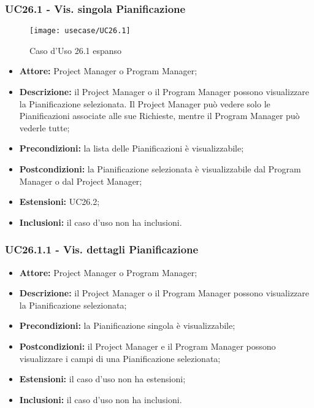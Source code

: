\subsubsection*{UC26.1 - Vis. singola Pianificazione}
\begin{figure}[H] 
    \texttt{[image: usecase/UC26.1]} 
    \caption{Caso d'Uso 26.1 espanso}
\end{figure}

\begin{itemize}[label=$\circ$]
\item \textbf{Attore:}  Project Manager o Program Manager;
\item \textbf{Descrizione:} il Project Manager o il Program Manager possono visualizzare la Pianificazione selezionata. Il Project Manager può vedere solo le Pianificazioni associate alle sue Richieste, mentre il Program Manager può vederle tutte;
\item \textbf{Precondizioni:} la lista delle Pianificazioni è visualizzabile;
\item \textbf{Postcondizioni:} la Pianificazione selezionata è visualizzabile dal Program Manager o dal Project Manager;
\item \textbf{Estensioni:} UC26.2;
\item \textbf{Inclusioni:} il caso d'uso non ha inclusioni.
\end{itemize}

\subsubsection*{UC26.1.1 - Vis. dettagli Pianificazione}
\begin{itemize}[label=$\circ$]
\item \textbf{Attore:}  Project Manager o Program Manager;
\item \textbf{Descrizione:} il Project Manager o il Program Manager possono visualizzare la
Pianificazione selezionata;
\item \textbf{Precondizioni:} la Pianificazione singola è visualizzabile;
\item \textbf{Postcondizioni:} il Project Manager e il Program Manager possono visualizzare
i campi di una Pianificazione selezionata;
\item \textbf{Estensioni:} il caso d'uso non ha estensioni;
\item \textbf{Inclusioni:} il caso d'uso non ha inclusioni.
\end{itemize}


